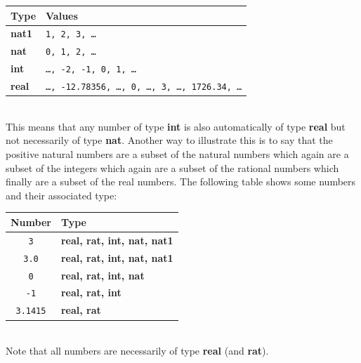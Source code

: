 \documentclass{overturerepchap}
\newcommand{\keyw}[1]{{\bf\ttfamily #1}}
\begin{document}
\vspace{1ex}
\begin{tabular}{|l|l|} \hline
  Type & Values \\ \hline
  \keyw{nat1}& {\tt 1, 2, 3, \ldots}\\
  \keyw{nat} & {\tt 0, 1, 2, \ldots}\\
  \keyw{int} & {\tt \ldots, -2, -1, 0, 1, \ldots}\\
  \keyw{real} & {\tt \ldots, -12.78356, \ldots, 0, \ldots, 3, \ldots, 1726.34, \ldots}\\ \hline
\end{tabular}

\mbox{}\\
This means that any number of type \keyw{int} is also automatically of type
\keyw{real} but not necessarily of type \keyw{nat}.  Another way to
illustrate this is to say that the positive natural numbers are a subset of
the natural numbers which again are a subset of the integers which again
are a subset of the rational numbers which finally are a subset of the real
numbers. The following table shows some numbers and their associated
type:

\vspace{1ex}
\begin{tabular}{|c|l|} \hline
  Number & Type \\ \hline
  {\tt 3}      & \keyw{real, rat, int, nat, nat1} \\
  {\tt 3.0}    & \keyw{real, rat, int, nat, nat1} \\
  {\tt 0}      & \keyw{real, rat, int, nat} \\
  {\tt -1}     & \keyw{real, rat, int}\\
  {\tt 3.1415} & \keyw{real, rat} \\ \hline
\end{tabular}

\mbox{}\\
Note that all numbers are necessarily of type \keyw{real} (and
\keyw{rat}).
\end{document}
